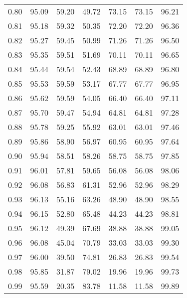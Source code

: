 \begin{tabular}{|c|c|c|c|c|c|c|}
      0.80 &     95.09 &     59.20 &      49.72 &   73.15 &      73.15 &         96.21 \\
      0.81 &     95.18 &     59.32 &      50.35 &   72.20 &      72.20 &         96.36 \\
      0.82 &     95.27 &     59.45 &      50.99 &   71.26 &      71.26 &         96.50 \\
      0.83 &     95.35 &     59.51 &      51.69 &   70.11 &      70.11 &         96.65 \\
      0.84 &     95.44 &     59.54 &      52.43 &   68.89 &      68.89 &         96.80 \\
      0.85 &     95.53 &     59.59 &      53.17 &   67.77 &      67.77 &         96.95 \\
      0.86 &     95.62 &     59.59 &      54.05 &   66.40 &      66.40 &         97.11 \\
      0.87 &     95.70 &     59.47 &      54.94 &   64.81 &      64.81 &         97.28 \\
      0.88 &     95.78 &     59.25 &      55.92 &   63.01 &      63.01 &         97.46 \\
      0.89 &     95.86 &     58.90 &      56.97 &   60.95 &      60.95 &         97.64 \\
      0.90 &     95.94 &     58.51 &      58.26 &   58.75 &      58.75 &         97.85 \\
      0.91 &     96.01 &     57.81 &      59.65 &   56.08 &      56.08 &         98.06 \\
      0.92 &     96.08 &     56.83 &      61.31 &   52.96 &      52.96 &         98.29 \\
      0.93 &     96.13 &     55.16 &      63.26 &   48.90 &      48.90 &         98.55 \\
      0.94 &     96.15 &     52.80 &      65.48 &   44.23 &      44.23 &         98.81 \\
      0.95 &     96.12 &     49.39 &      67.69 &   38.88 &      38.88 &         99.05 \\
      0.96 &     96.08 &     45.04 &      70.79 &   33.03 &      33.03 &         99.30 \\
      0.97 &     96.00 &     39.50 &      74.81 &   26.83 &      26.83 &         99.54 \\
      0.98 &     95.85 &     31.87 &      79.02 &   19.96 &      19.96 &         99.73 \\
      0.99 &     95.59 &     20.35 &      83.78 &   11.58 &      11.58 &         99.89 \\
\bottomrule
\end{tabular}
